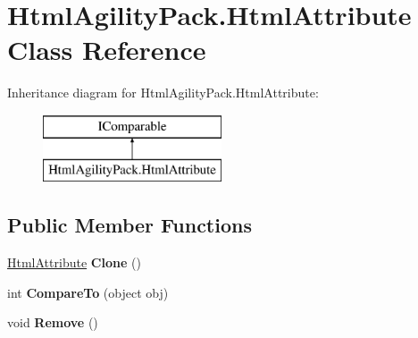 \hypertarget{class_html_agility_pack_1_1_html_attribute}{}\section{Html\+Agility\+Pack.\+Html\+Attribute Class Reference}
\label{class_html_agility_pack_1_1_html_attribute}
Inheritance diagram for Html\+Agility\+Pack.\+Html\+Attribute\+:\begin{figure}[H]
\begin{center}
\leavevmode
\includegraphics[height=2.000000cm]{class_html_agility_pack_1_1_html_attribute}
\end{center}
\end{figure}
\subsection*{Public Member Functions}
\begin{DoxyCompactItemize}
\item 
\mbox{\label{class_html_agility_pack_1_1_html_attribute_a45f91960f8aa5f800790435a012fab94}} 
\hyperlink{class_html_agility_pack_1_1_html_attribute}{Html\+Attribute} {\bfseries Clone} ()
\item 
\mbox{\label{class_html_agility_pack_1_1_html_attribute_ab3be22f2a16485e0cb8c811d06dc2e0f}} 
int {\bfseries Compare\+To} (object obj)
\item 
\mbox{\label{class_html_agility_pack_1_1_html_attribute_afb8c60be879eda1277977542584a4c8b}} 
void {\bfseries Remove} ()
\end{DoxyCompactItemize}
